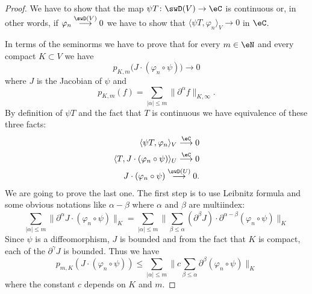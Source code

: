 \begin{proof}
	We have to show that the map \( \psi T\colon \swD(V)\to \eC\) is continuous or, in other words, if \( \varphi_n\stackrel{\swD(V)}{\longrightarrow}0\) we have to show that \( \langle \psi T, \varphi_n\rangle_V\to 0\) in \( \eC\).

	In terms of the seminorms we have to prove that for every \( m\in \eN\) and every compact \( K\subset V\) we have
	\begin{equation}
		p_{K,m}\big( J\cdot(\varphi_n\circ \psi) \big)\to 0
	\end{equation}
	where \( J\) is the Jacobian of \( \psi\) and
	\begin{equation}
		p_{K,m}(f)=\sum_{| \alpha |\leq m}\| \partial^{\alpha}f \|_{K,\infty}.
	\end{equation}
	By definition of \( \psi T\) and the fact that \( T\) is continuous we have equivalence of these three facts:
	\begin{subequations}
		\begin{align}
			\langle \psi T, \varphi_n\rangle_V\stackrel{\eC}{\longrightarrow}0                  \\
			\langle  T, J\cdot (\varphi_n\circ \psi)  \rangle_U\stackrel{\eC}{\longrightarrow}0 \\
			J\cdot(\varphi_n\circ\psi)\stackrel{\swD(U)}{\longrightarrow}0.
		\end{align}
	\end{subequations}
	We are going to prove the last one. The first step is to use Leibnitz formula and some obvious notations like \( \alpha-\beta\) where \( \alpha\) and \( \beta\) are multiindex:
	\begin{equation}
		\sum_{| \alpha |\leq m}\| \partial^{\alpha}J\cdot(\varphi_n\circ\psi) \|_{K}=\sum_{| \alpha |\leq m}\| \sum_{\beta\leq \alpha}(\partial^{\beta}J)\cdot \partial^{\alpha-\beta}(\varphi_n\circ\psi) \|_K
	\end{equation}
	Since \( \psi\) is a diffeomorphism, \( J\) is bounded and from the fact that \( K\) is compact, each of the \( \partial^{\gamma}J\) is bounded. Thus we have
	\begin{equation}
		p_{m,K}(J\cdot (\varphi_n\circ \psi))\leq \sum_{| \alpha |\leq m}\|c \sum_{\beta\leq \alpha} \partial^{\beta}(\varphi_n\circ\psi) \|_{K}
	\end{equation}
	where the constant \( c\) depends on \( K\) and \( m\).


\end{proof}
